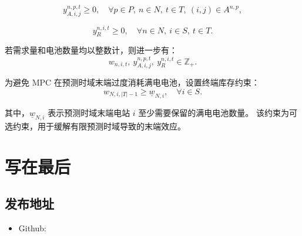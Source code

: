 \documentclass[12pt,hyperref,a4paper,UTF8]{ctexart}
\begin{document}
\begin{equation}
y^{n,p,t}_{A,i,j}\ge 0,
\quad \forall p\in P,\ n\in N,\ t\in T,\ (i,j)\in A^{n,p},
\tag{9c}
\end{equation}

\begin{equation}
y^{n,i,t}_{R}\ge 0,
\quad \forall n\in N,\ i\in S,\ t\in T.
\tag{9d}
\end{equation}

若需求量和电池数量均以整数计，则进一步有：
\begin{equation}
w_{n,i,t},\ y^{n,p,t}_{A,i,j},\ y^{n,i,t}_{R}\in \mathbb{Z}_{+}.
\tag{9e}
\end{equation}





为避免 MPC 在预测时域末端过度消耗满电电池，设置终端库存约束：
\begin{equation}
w_{N,i,|T|-1}\ge \underline{w}_{N,i},
\quad \forall i\in S.
\tag{9i}
\end{equation}

其中，$\underline{w}_{N,i}$ 表示预测时域末端电站 $i$ 至少需要保留的满电电池数量。
该约束为可选约束，用于缓解有限预测时域导致的末端效应。

\section{写在最后}
\subsection{发布地址}
\begin{itemize}
    \item Github: 
\end{itemize}


\end{document}
